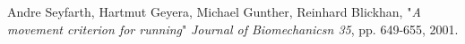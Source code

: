 \documentclass[11pt]{article}
\begin{document}
\begin{thebibliography}{1}

     Andre Seyfarth, Hartmut Geyera, Michael Gunther, Reinhard Blickhan, "\textit{A movement criterion for running}" \emph{Journal of Biomechanicsn 35}, pp. 649-655, 2001.

\end{thebibliography}
\end{document}
